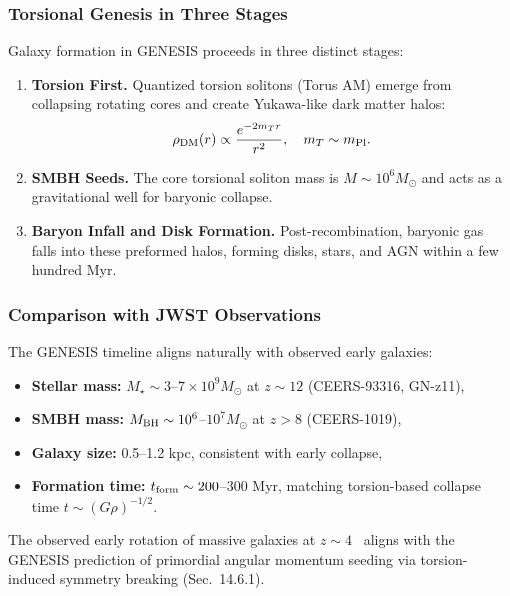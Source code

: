 \documentclass{article}
\begin{document}
\subsubsection{Torsional Genesis in Three Stages}
Galaxy formation in GENESIS proceeds in three distinct stages:
\begin{enumerate}
  \item \textbf{Torsion First.} Quantized torsion solitons (Torus AM) emerge from collapsing rotating cores and create Yukawa-like dark matter halos:
\begin{equation}
  \rho_{\rm DM}(r) \propto \frac{e^{-2m_T r}}{r^2}, \quad m_T \sim m_{\rm Pl}.
\end{equation}

  \item \textbf{SMBH Seeds.} The core torsional soliton mass is $M \sim 10^6 M_\odot$ and acts as a gravitational well for baryonic collapse.

  \item \textbf{Baryon Infall and Disk Formation.} Post-recombination, baryonic gas falls into these preformed halos, forming disks, stars, and AGN within a few hundred Myr.
\end{enumerate}

\subsubsection{Comparison with JWST Observations}
The GENESIS timeline aligns naturally with observed early galaxies:
\begin{itemize}
  \item \textbf{Stellar mass:} $M_\star \sim 3$--$7 \times 10^9 M_\odot$ at $z \sim 12$ (CEERS-93316, GN-z11),
  \item \textbf{SMBH mass:} $M_{\rm BH} \sim 10^6$--$10^7 M_\odot$ at $z > 8$ (CEERS-1019),
  \item \textbf{Galaxy size:} 0.5--1.2 kpc, consistent with early collapse,
  \item \textbf{Formation time:} $t_{\rm form} \sim 200$--$300$ Myr, matching torsion-based collapse time $t \sim (G \rho)^{-1/2}$.
\end{itemize}

The observed early rotation of massive galaxies at \( z \sim 4 \)~\cite{inoue2021} aligns with the GENESIS prediction of primordial angular momentum seeding via torsion-induced symmetry breaking (Sec.~14.6.1).
\end{document}
